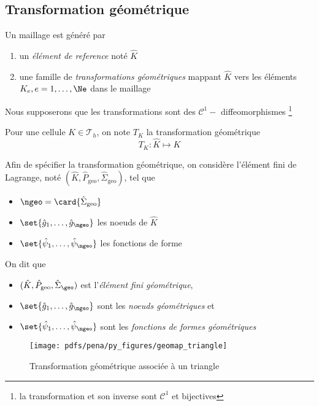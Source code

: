 \subsection{Transformation géométrique}
\label{sec:transf-geom}

Un maillage est généré par
\begin{enumerate}
\item un \emph{élément de reference} noté $\hat{K}$
\item une famille de  \emph{transformations géométriques} mappant $\hat{K}$
  vers les éléments $K_e, e=1,\ldots,\Ne$ dans le maillage
\end{enumerate}

Nous supposerons que les transformations sont des $\mathcal{C}^1-$
diffeomorphismes \footnote{la transformation et son inverse sont
$\mathcal{C}^1$ et bijectives}

\begin{definition}
  \label{def:32}
  Pour une cellule $K \in \mathcal{T}_h$, on note $T_K$ la  transformation géométrique
  \begin{equation}
    \label{eq:36}
    T_K: \hat{K} \mapsto K
  \end{equation}
\end{definition}

Afin de spécifier la transformation géométrique, on  considère l'élément fini
de Lagrange, noté $(\hat{K},\hat{P}_{\mathrm{geo}},
\hat{\Sigma}_{\mathrm{geo}})$, tel que
  \begin{itemize}
  \item $\ngeo = \card{\hat{\Sigma}_{\mathrm{geo}}}$
  \item $\set{\hat{g}_1,\ldots,\hat{g}_{\ngeo}}$ les noeuds de $\hat{K}$
  \item $\set{\hat{\psi}_1,\ldots,\hat{\psi}_{\ngeo}}$ les fonctions de forme
  \end{itemize}

\begin{definition}
  On dit que
  \begin{itemize}
  \item $(\hat{K},\hat{P}_{\mathrm{geo}}, \hat{\Sigma}_{\geo})$ est
    l'\emph{élément fini géométrique},
  \item $\set{\hat{g}_1,\ldots,\hat{g}_{\ngeo}}$ sont les  \emph{noeuds géométriques} et
  \item $\set{\hat{\psi}_1,\ldots,\hat{\psi}_{\ngeo}}$ sont les
    \emph{fonctions de formes géométriques}
  \end{itemize}
\end{definition}
\begin{figure}[htbp]
  \centering
  \centerline{\texttt{[image: pdfs/pena/py\_figures/geomap\_triangle]}}
  \caption{Transformation géométrique associée à un triangle}
  \label{fig:3}
\end{figure}

